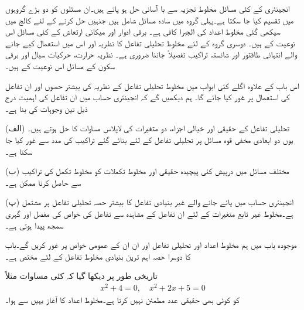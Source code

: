 انجینئری کے کئی مسائل مخلوط تجزیہ سے با آسانی حل ہو پاتے ہیں۔ان مسئلوں کو دو بڑے گروہوں میں تقسیم کیا جا سکتا ہے۔پہلی گروہ میں سادہ مسائل شامل ہیں جنہیں حل کرنے کے لئے کالج میں سیکھی گئی مخلوط اعداد کی الجبرا کافی ہے۔ برقی ادوار اور میکانی ارتعاش  کے کئی مسائل اس نوعیت کے ہیں۔ دوسری گروہ کے لئے مخلوط تحلیلی تفاعل کا نظریہ اور اس میں استعمال کیے جانے والے انتہائی طاقتور اور شائستہ تراکیب  تفصیلاً جاننا ضروری ہے۔ نظریہ حرارت، حرکیات سیال اور برقی سکون کے مسائل اس نوعیت کے ہیں۔

اس باب کے علاوہ اگلے کئی ابواب میں مخلوط تحلیلی تفاعل کے نظریہ کی بیشتر حصوں اور ان تفاعل کی استعمال  پر غور کیا جائے گا۔ ہم دیکھیں گے کہ انجینئری حساب میں ان تفاعل کی اہمیت درج ذیل تین وجوہات کی بنا ہے۔\\
\begin{description}
\item{(الف)}
تحلیلی تفاعل کے حقیقی اور خیالی اجزاء، دو متغیرات کی لاپلاس مساوات کا حل ہوتے ہیں۔ یوں دو ابعادی مخفی قوہ مسائل پر تحلیلی تفاعل کے لئے بنائے گئے تراکیب کی مدد سے غور کیا جا سکتا ہے۔
\item{(ب)}
مختلف مسائل میں درپیش کئی پیچیدہ حقیقی اور مخلوط تکملات کو مخلوط تکمل کی تراکیب سے حاصل کرنا ممکن ہے۔
\item{(پ)}
انجینئری حساب میں پائے جانے والے غیر بنیادی تفاعل کا بیشتر حصہ تحلیلی تفاعل پر مشتمل ہے۔مخلوط غیر تابع متغیرات کے لئے ان تفاعل کے مشاہدہ  سے تفاعل کی خواص کی مفصل اور گہری  سمجھ پیدا ہوتی ہے۔
\end{description}

موجودہ باب میں ہم مخلوط اعداد اور تحلیلی تفاعل اور ان ان کے عمومی خواص پر غور کریں گے۔باب کا دوسرا حصہ اہم ترین بنیادی مخلوط تفاعل کے لئے مختص ہے۔

تاریخی طور پر دیکھا گیا کہ کئی مساوات مثلاً 
\begin{align*}
x^2+4=0,\quad x^2+2x+5=0
\end{align*}
 کو کوئی بھی حقیقی عدد مطمئن نہیں کرتا ہے۔مخلوط اعداد کا آغاز یہیں سے ہوا۔

